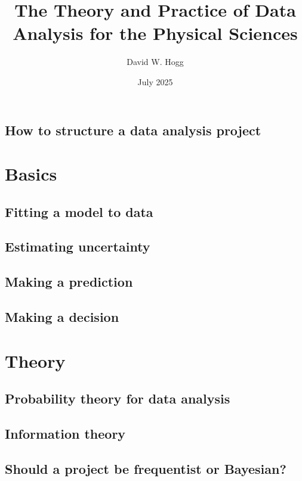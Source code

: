 \documentclass[10pt]{book}
\title{\bfseries%
The Theory and Practice of Data Analysis
for the Physical Sciences}
\author{David W. Hogg}
\date{July 2025}
\begin{document}
\maketitle
\tableofcontents



\chapter{How to structure a data analysis project}

\part{Basics}

\chapter{Fitting a model to data}





\chapter{Estimating uncertainty}

\chapter{Making a prediction}

\chapter{Making a decision}

\part{Theory}

\chapter{Probability theory for data analysis}

\chapter{Information theory}

\chapter{Should a project be frequentist or Bayesian?}
\end{document}
